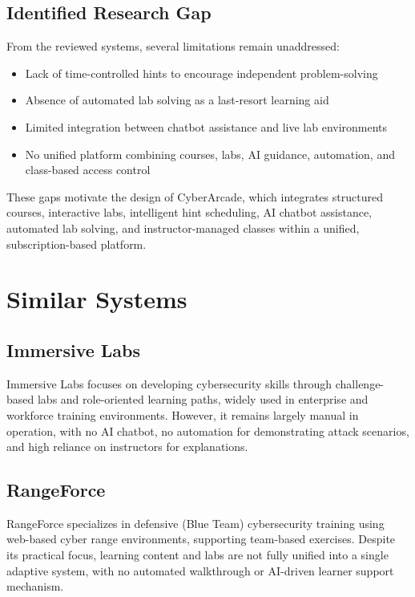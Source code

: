 \documentclass[12pt,a4paper]{report}
\begin{document}
\subsection{Identified Research Gap}

From the reviewed systems, several limitations remain unaddressed:
\begin{itemize}
  \item Lack of time-controlled hints to encourage independent problem-solving
  \item Absence of automated lab solving as a last-resort learning aid
  \item Limited integration between chatbot assistance and live lab environments
  \item No unified platform combining courses, labs, AI guidance, automation, and class-based access control
\end{itemize}

These gaps motivate the design of CyberArcade, which integrates structured courses, interactive labs,
intelligent hint scheduling, AI chatbot assistance, automated lab solving, and instructor-managed
classes within a unified, subscription-based platform.

\section{Similar Systems}

\subsection{Immersive Labs}

Immersive Labs focuses on developing cybersecurity skills through challenge-based labs and
role-oriented learning paths, widely used in enterprise and workforce training environments. However,
it remains largely manual in operation, with no AI chatbot, no automation for demonstrating attack
scenarios, and high reliance on instructors for explanations.

\subsection{RangeForce}

RangeForce specializes in defensive (Blue Team) cybersecurity training using web-based cyber range
environments, supporting team-based exercises. Despite its practical focus, learning content and labs
are not fully unified into a single adaptive system, with no automated walkthrough or AI-driven
learner support mechanism.
\end{document}

